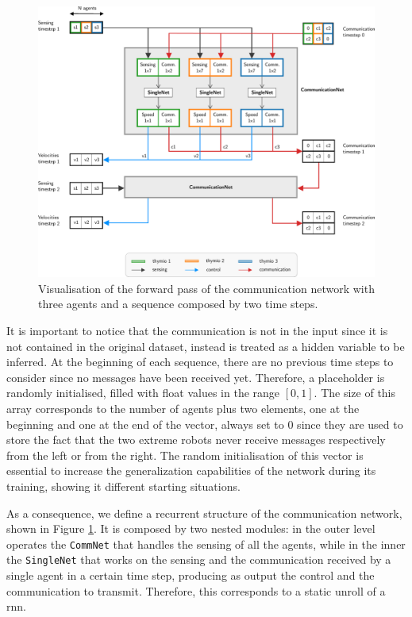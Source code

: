 \begin{figure}[!htb]
	\centering
	\includegraphics[width=\textwidth]{contents/images/commnet2}
	\caption[Communication network.]{Visualisation of the forward pass of the 
		communication network with three agents and a sequence composed by two 
		time steps.}
	\label{fig:commnet1}
\end{figure}

It is important to notice that the communication is not in the input since it is not 
contained in the original dataset, instead is treated as a hidden variable to be 
inferred. 
At the beginning of each sequence, there are no previous time steps to consider 
since no messages have been received yet. Therefore, a placeholder is randomly 
initialised, filled with float values in the range $[0, 1]$. 
The size of this array corresponds to the number of agents plus two elements, one 
at the beginning and one at the end of the vector, always set to $0$ since they are 
used to store the fact that the two extreme robots never receive messages 
respectively from the left or from the right. 
The random initialisation of this vector is essential to increase the generalization 
capabilities of the network during its training, showing it different starting 
situations.

As a consequence, we define a recurrent structure of the communication 
network, shown in Figure \ref{fig:commnet1}.
It is composed by two nested modules: in the outer level operates the 
\texttt{CommNet} that handles the sensing of all the agents, while in the inner the 
\texttt{SingleNet} that works on the sensing and the communication received by a 
single agent in a certain time step, producing as output the control and the 
communication to transmit. 
Therefore, this corresponds to a static unroll of a \gls{rnn}.%

